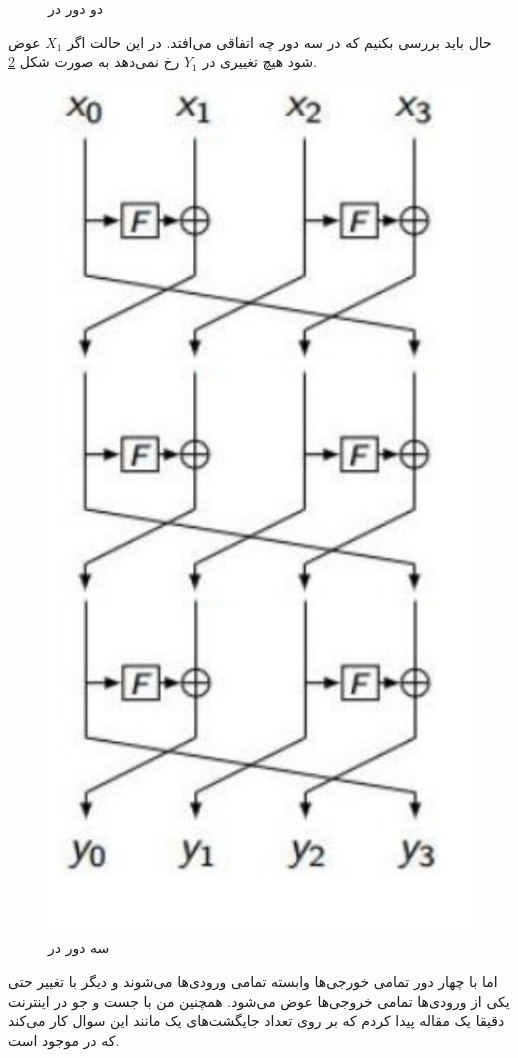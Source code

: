 \documentclass[]{article}
\begin{document}
\begin{enumerate}
\begin{figure}
        \caption{دو دور در }
        \label{fig:generalized-feistel:2round}
    \end{figure}
    حال باید بررسی بکنیم که در سه دور چه اتفاقی می‌افتد. در این حالت اگر
    $X_1$
    عوض شود هیچ تغییری در
    $Y_1$
    رخ نمی‌دهد به صورت شکل
    \ref{fig:generalized-feistel:3round}.
    \begin{figure}
        \centering
        \includegraphics[scale=0.5]{pics/3-3-rounds.jpg}
        \caption{سه دور در }
        \label{fig:generalized-feistel:3round}
    \end{figure}
    اما با چهار دور تمامی خورجی‌ها وابسته تمامی ورودی‌ها می‌شوند و دیگر با تغییر حتی یکی
    از ورودی‌ها تمامی خروجی‌ها عوض می‌شود. همچنین من با جست و جو در اینترنت دقیقا یک مقاله پیدا کردم
    که بر روی تعداد جایگشت‌های یک
    مانند این سوال کار می‌کند که در
    موجود است.
\end{enumerate}
\end{document}
